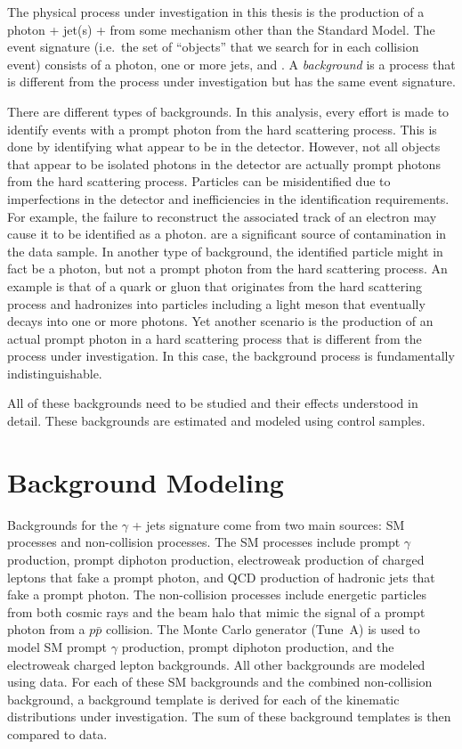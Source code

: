 \vspace{0.015\textheight}
The physical process under investigation in this thesis is the production of a photon + jet(s) + \met from some mechanism other than the Standard Model. The event signature (i.e.~the set of ``objects'' that we search for in each collision event) consists of a photon, one or more jets, and \met. A \textit{background} is a process that is different from the process under investigation but has the same event signature.

There are different types of backgrounds. In this analysis, every effort is made to identify events with a prompt photon from the hard scattering process. This is done by identifying what appear to be  in the detector. However, not all objects that appear to be isolated photons in the detector are actually prompt photons from the hard scattering process. Particles can be misidentified due to imperfections in the detector and inefficiencies in the identification requirements. For example, the failure to reconstruct the associated track of an electron may cause it to be identified as a photon.  are a significant source of contamination in the data sample. In another type of background, the identified particle might in fact be a photon, but not a prompt photon from the hard scattering process. An example is that of a quark or gluon that originates from the hard scattering process and hadronizes into particles including a light meson that eventually decays into one or more photons. Yet another scenario is the production of an actual prompt photon in a hard scattering process that is different from the process under investigation. In this case, the background process is fundamentally indistinguishable.%

All of these backgrounds need to be studied and their effects understood in detail. These backgrounds are estimated and modeled using control samples.

\section{Background Modeling}

Backgrounds for the $\gamma$ + jets signature come from two main sources: SM processes and non-collision processes. The SM processes include prompt $\gamma$ production, prompt diphoton production, electroweak production of charged leptons that fake a prompt photon, and QCD production of hadronic jets that fake a prompt photon. The non-collision processes include energetic particles from both cosmic rays and the beam halo that mimic the signal of a prompt photon from a $p\bar{p}$ collision. The \pythiaText Monte Carlo generator (Tune~A) \cite{pap:PythiaManual} is used to model SM prompt $\gamma$ production, prompt diphoton production, and the electroweak charged lepton backgrounds. All other backgrounds are modeled using data. For each of these SM backgrounds and the combined non-collision background, a background template is derived for each of the kinematic distributions under investigation. The sum of these background templates is then compared to data.

